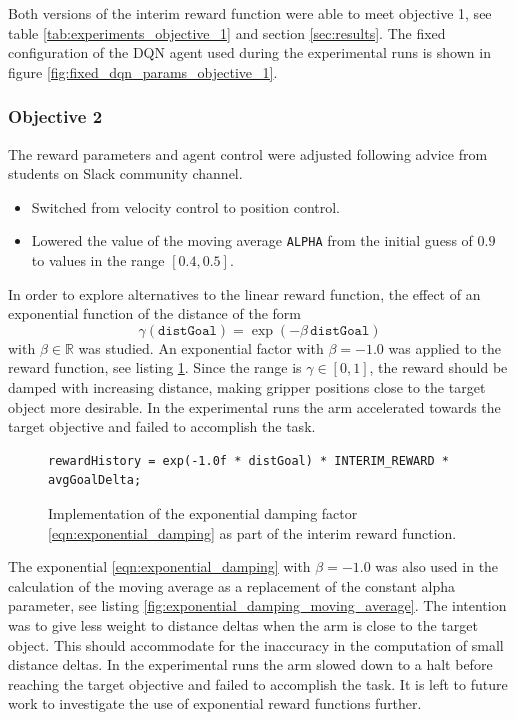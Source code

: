 \documentclass[11pt, onecolumn, oneside, reqno]{amsart}
\begin{document}
Both versions of the interim reward function were able to meet objective 1, see table \ref{tab:experiments_objective_1} and section \ref{sec:results}. The fixed configuration of the DQN agent used during the experimental runs is shown in figure \ref{fig:fixed_dqn_params_objective_1}.

\subsubsection{Objective 2}
The reward parameters and agent control were adjusted following advice from students on Slack community channel.
\begin{itemize}
\item Switched from velocity control to position control.
\item Lowered the value of the moving average \texttt{ALPHA} from the initial guess of $0.9$ to values in the range $\left[0.4, 0.5\right]$.
\end{itemize}

In order to explore alternatives to the linear reward function, the effect of an exponential function of the distance of the form
\begin{equation}
\label{eqn:exponential_damping}
\gamma \left(\mathtt{distGoal}\right) = \exp \left( -\beta \, \mathtt{distGoal} \right)
\end{equation}
with $\beta \in \mathbb{R}$ was studied. An exponential factor with $\beta = -1.0$ was applied to the reward function, see listing \ref{fig:exponential_damping_reward}. Since the range is $\gamma  \in \left[0, 1\right]$, the reward should be damped with increasing distance, making gripper positions close to the target object more desirable. In the experimental runs the arm accelerated towards the target objective and failed to accomplish the task.

\begin{figure}[thpb]
\centering
\begin{lstlisting}
rewardHistory = exp(-1.0f * distGoal) * INTERIM_REWARD * avgGoalDelta;
\end{lstlisting}
\caption{Implementation of the exponential damping factor \ref{eqn:exponential_damping} as part of the interim reward function.}
\label{fig:exponential_damping_reward}
\end{figure}

The exponential \ref{eqn:exponential_damping} with $\beta = -1.0$ was also used in the calculation of the moving average as a replacement of the constant alpha parameter, see listing \ref{fig:exponential_damping_moving_average}. The intention was to give less weight to distance deltas when the arm is close to the target object. This should accommodate for the inaccuracy in the computation of small distance deltas. In the experimental runs the arm slowed down to a halt before reaching the target objective and failed to accomplish the task. It is left to future work to investigate the use of exponential reward functions further.
\end{document}
